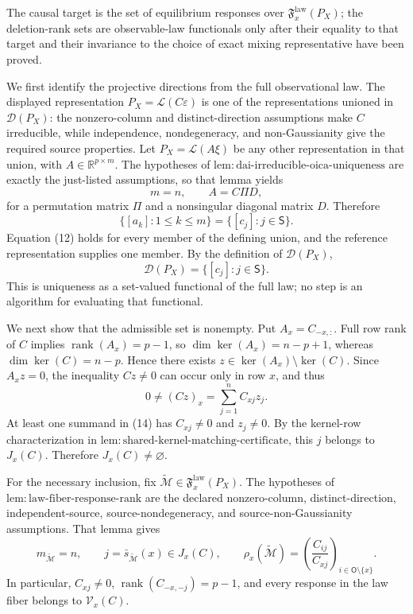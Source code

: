The causal target is the set of equilibrium responses over \(\mathfrak F_x^{\mathrm{law}}(P_X)\); the deletion-rank sets are observable-law functionals only after their equality to that target and their invariance to the choice of exact mixing representative have been proved.

We first identify the projective directions from the full observational law. The displayed representation \(P_X=\mathcal L(C\varepsilon)\) is one of the representations unioned in \(\mathcal D(P_X)\): the nonzero-column and distinct-direction assumptions make \(C\) irreducible, while independence, nondegeneracy, and non-Gaussianity give the required source properties. Let \(P_X=\mathcal L(A\xi)\) be any other representation in that union, with \(A\in\mathbb R^{p\times m}\). The hypotheses of \(\mathrm{lem:dai\text{-}irreducible\text{-}oica\text{-}uniqueness}\) are exactly the just-listed assumptions, so that lemma yields
\[
 m=n,
 \qquad
 A=C\Pi D, \tag{11}
\]
for a permutation matrix \(\Pi\) and a nonsingular diagonal matrix \(D\). Therefore
\[
 \{[a_k]:1\le k\le m\}=\{[c_j]:j\in\mathsf S\}. \tag{12}
\]
Equation (12) holds for every member of the defining union, and the reference representation supplies one member. By the definition of \(\mathcal D(P_X)\),
\[
 \mathcal D(P_X)=\{[c_j]:j\in\mathsf S\}. \tag{13}
\]
This is uniqueness as a set-valued functional of the full law; no step is an algorithm for evaluating that functional.

We next show that the admissible set is nonempty. Put \(A_x=C_{-x,:}\). Full row rank of \(C\) implies \(\operatorname{rank}(A_x)=p-1\), so \(\dim\ker(A_x)=n-p+1\), whereas \(\dim\ker(C)=n-p\). Hence there exists \(z\in\ker(A_x)\setminus\ker(C)\). Since \(A_xz=0\), the inequality \(Cz\ne0\) can occur only in row \(x\), and thus
\[
 0\ne(Cz)_x=\sum_{j=1}^n C_{xj}z_j. \tag{14}
\]
At least one summand in (14) has \(C_{xj}\ne0\) and \(z_j\ne0\). By the kernel-row characterization in \(\mathrm{lem:shared\text{-}kernel\text{-}matching\text{-}certificate}\), this \(j\) belongs to \(J_x(C)\). Therefore \(J_x(C)\ne\varnothing\).

For the necessary inclusion, fix \(\widetilde{\mathcal M}\in\mathfrak F_x^{\mathrm{law}}(P_X)\). The hypotheses of \(\mathrm{lem:law\text{-}fiber\text{-}response\text{-}rank}\) are the declared nonzero-column, distinct-direction, independent-source, source-nondegeneracy, and source-non-Gaussianity assumptions. That lemma gives
\[
 m_{\widetilde{\mathcal M}}=n,
 \qquad
 j=\bar s_{\widetilde{\mathcal M}}(x)\in J_x(C),
 \qquad
 \rho_x(\widetilde{\mathcal M})
 =\left(\frac{C_{ij}}{C_{xj}}\right)_{i\in\mathsf O\setminus\{x\}}. \tag{15}
\]
In particular, \(C_{xj}\ne0\), \(\operatorname{rank}(C_{-x,-j})=p-1\), and every response in the law fiber belongs to \(\mathcal V_x(C)\).

